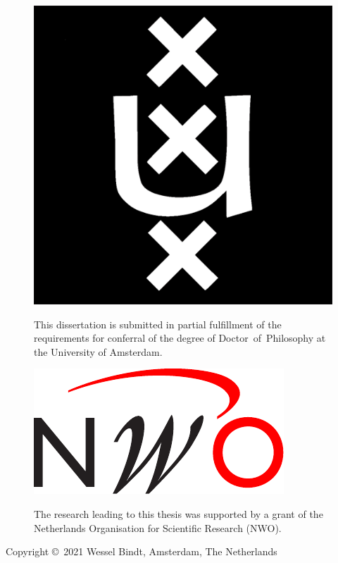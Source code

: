 {\pagestyle{empty}
\begin{figure}[!h]
   \begin{minipage}[c][2.0cm]{0.3\textwidth}
      \vspace{0pt}
      \centering\includegraphics[width=0.65\linewidth]{assets/University_of_Amsterdam_logo.eps}
   \end{minipage}
   \hfill
   \begin{minipage}[c][2.0cm]{0.65\textwidth}
      \vspace{0pt}%
	This dissertation is submitted in partial fulfillment of the requirements for conferral of the degree of \mbox{Doctor of Philosophy} at the University of \mbox{Amsterdam}.
   \end{minipage}
\end{figure}
%
\begin{figure}[!h]
   \begin{minipage}[c][2.0cm]{0.3\textwidth}
      \vspace{0pt}
       \centering\includegraphics[width=0.9\linewidth]{assets/NWO_logo.pdf}
   \end{minipage}
   \hfill
   \begin{minipage}[c][2.0cm]{0.65\textwidth}
      \vspace{0pt}%
    The research leading to this thesis was supported by a grant of the
    Netherlands Organisation for Scientific Research (NWO). \end{minipage}
\end{figure}
%
\vfill

\noindent
Copyright \copyright~2021 Wessel Bindt, Amsterdam, The Netherlands\\
}
